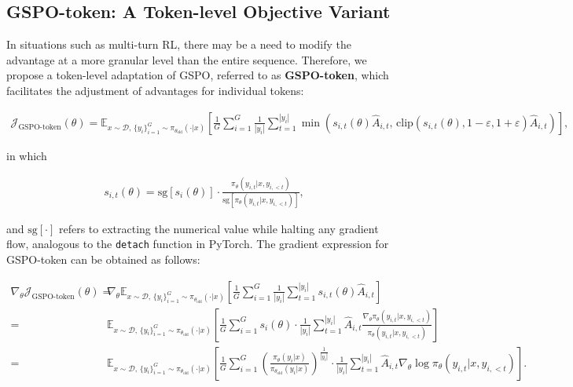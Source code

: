 \subsection{GSPO-token: A Token-level Objective Variant}

In situations such as multi-turn RL, there may be a need to modify the advantage at a more granular level than the entire sequence. Therefore, we propose a token-level adaptation of GSPO, referred to as \textbf{GSPO-token}, which facilitates the adjustment of advantages for individual tokens:

\begin{align}
\mathcal{J}_\text{GSPO-token}(\theta)
=
\mathbb{E}_{ x \sim \mathcal{D},\, \{y_i\}_{i=1}^G \sim \pi_{\theta_\text{old}}( \cdot | x) }
\left[ 
\frac{1}{G} \sum_{i=1}^{G} \frac{1}{|y_i|} \sum_{t=1}^{|y_i|} 
\min \left( s_{i,t}(\theta) \widehat{A}_{i,t},  \, \mathrm{clip} \left( s_{i,t}(\theta), 1 - {\varepsilon}, 1 + {\varepsilon} \right) \widehat{A}_{i,t} \right) 
\right],
\label{equ:gspo-token}
\end{align}

in which

\begin{align}
s_{i,t}(\theta) 
= \mathrm{sg} \left[ s_{i}(\theta) \right]  \cdot \frac{ \pi_{\theta} (y_{i,t} | x, y_{i,<t}) }{ \mathrm{sg} \left[ \pi_{\theta} (y_{i,t} | x, y_{i,<t}) \right] },
\end{align}

and $\mathrm{sg}[\cdot]$ refers to extracting the numerical value while halting any gradient flow, analogous to the \texttt{detach} function in PyTorch. The gradient expression for GSPO-token can be obtained as follows:

\begin{align}
\nabla_{\theta} \mathcal{J}_\text{GSPO-token}(\theta)
=&\ 
\nabla_{\theta} \mathbb{E}_{ x \sim \mathcal{D},\, \{y_i\}_{i=1}^G \sim \pi_{\theta_\text{old}}( \cdot | x) }
\left[ 
\frac{1}{G} \sum_{i=1}^{G}
\frac{1}{|y_i|} \sum_{t=1}^{|y_i|} 
s_{i,t}(\theta) \widehat{A}_{i,t}
\right] \\
=&\ 
\mathbb{E}_{ x \sim \mathcal{D},\, \{y_i\}_{i=1}^G \sim \pi_{\theta_\text{old}}( \cdot | x) }
\left[ 
\frac{1}{G} \sum_{i=1}^{G} s_i (\theta) \cdot \frac{1}{|y_i|} \sum_{t=1}^{|y_i|} 
\widehat{A}_{i,t} \frac{ \nabla_{\theta} \pi_{\theta} (y_{i,t} | x, y_{i,<t}) }{ \pi_{\theta} (y_{i,t} | x, y_{i,<t}) }
\right] \\
=&\ 
\mathbb{E}_{ x \sim \mathcal{D},\, \{y_i\}_{i=1}^G \sim \pi_{\theta_\text{old}}( \cdot | x) }
\left[ 
\frac{1}{G} \sum_{i=1}^{G}  \left( \frac{ \pi_{\theta} (y_i | x) }{ \pi_{\theta_\text{old}} (y_i | x)} \right)^{\frac{1}{|y_i|}}
\cdot \frac{1}{|y_i|} \sum_{t=1}^{|y_i|}
\widehat{A}_{i,t} \nabla_{\theta} \log \pi_{\theta} (y_{i,t} | x, y_{i,<t})  
\right].
\label{equ:gspo-token_grad}
\end{align}

